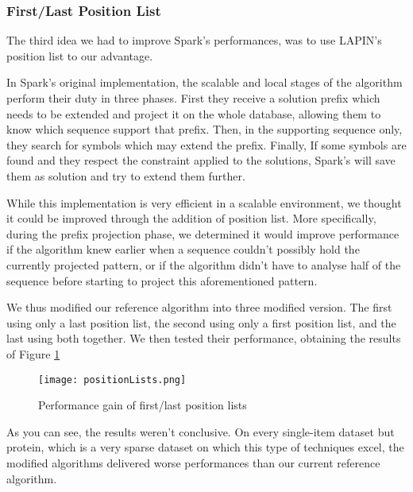 \documentclass{eplmastersthesis}
\begin{document}
\subsubsection{First/Last Position List}

The third idea we had to improve Spark's performances, was to use LAPIN's position list to our advantage. \newline

In Spark's original implementation, the scalable and local stages of the algorithm perform their duty in three phases. First they receive a solution prefix which needs to be extended and project it on the whole database, allowing them to know which sequence support that prefix. Then, in the supporting sequence only, they search for symbols which may extend the prefix. Finally, If some symbols are found and they respect the constraint applied to the solutions, Spark's will save them as solution and try to extend them further. \newline

While this implementation is very efficient in a scalable environment, we thought it could be improved through the addition of position list. More specifically, during the prefix projection phase, we determined it would improve performance if the algorithm knew earlier when a sequence couldn't possibly hold the currently projected pattern, or if the algorithm didn't have to analyse half of the sequence before starting to project this aforementioned pattern. \newline

We thus modified our reference algorithm into three modified version. The first using only a last position list, the second using only a first position list, and the last using both together. We then tested their performance, obtaining the results of Figure \ref{fig:positionListPerf} \newline

\begin{figure}[h]
  \centering
  \texttt{[image: positionLists.png]}
  \caption{Performance gain of first/last position lists}
  \label{fig:positionListPerf}
\end{figure}

As you can see, the results weren't conclusive. On every single-item dataset but protein, which is a very sparse dataset on which this type of techniques excel, the modified algorithms delivered worse performances than our current reference algorithm. \newline
\end{document}
